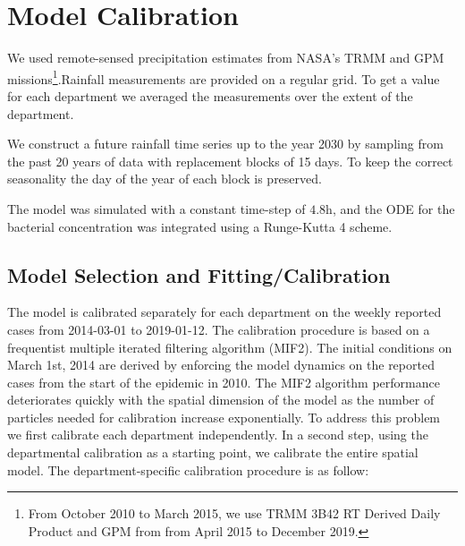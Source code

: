 \section{Model Calibration}
We used remote-sensed precipitation estimates from NASA's TRMM and GPM missions\footnote{From October 2010 to March 2015, we use TRMM 3B42 RT Derived Daily Product \parencite{Huffman:TRMMMultisatellitePrecipitation:2007} and GPM from from April 2015 to December 2019.}.Rainfall measurements are provided on a regular grid. To get a value for each department we averaged the measurements over the extent of the department.

We construct a future rainfall time series up to the year 2030 by sampling from the past 20 years of data  with replacement blocks of 15 days. To keep the correct seasonality the day of the year of each block is preserved.

The model was simulated with a constant time-step of $4.8$h, and the ODE for the bacterial concentration was integrated using a Runge-Kutta 4 scheme.


\subsection{Model Selection and Fitting/Calibration}



The model is calibrated separately for each department on the weekly reported cases from 2014-03-01 to 2019-01-12. The calibration procedure is based on a frequentist multiple iterated filtering algorithm (MIF2)\cite{Ionides:InferenceDynamicLatent:2015}. The initial conditions on March 1st, 2014 are derived by enforcing the model dynamics on the reported cases from the start of the epidemic in 2010. The MIF2 algorithm performance deteriorates quickly with the spatial dimension of the model as the number of particles needed for calibration increase exponentially\cite{Park:GuidedIntermediateResampling:2017}. To address this problem we first calibrate each department independently. In a second step, using the departmental calibration as a starting point, we calibrate the entire spatial model.
The department-specific calibration procedure is as follow:

